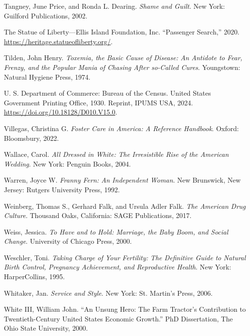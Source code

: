 \documentclass[
  american,
  letterpaper,
]{book}
\newlength{\cslhangindent}
\newenvironment{CSLReferences}[2] %
 {\begin{list}{}{%
  \setlength{\itemindent}{0pt}
  \setlength{\leftmargin}{0pt}
  \setlength{\parsep}{0pt}
  \ifodd #1
   \setlength{\leftmargin}{\cslhangindent}
   \setlength{\itemindent}{-1\cslhangindent}
  \fi
  \setlength{\itemsep}{#2\baselineskip}}}
 {\end{list}}
\begin{document}
\begin{CSLReferences}{1}{0}
Tangney, June Price, and Ronda L. Dearing. \emph{Shame and Guilt}. New
York: Guilford Publications, 2002.

The Statue of Liberty---Ellis Island Foundation, Inc. {``Passenger
Search,''} 2020. \url{https://heritage.statueofliberty.org/}.

Tilden, John Henry. \emph{Toxemia, the Basic Cause of Disease: An
Antidote to Fear, Frenzy, and the Popular Mania of Chasing After
so-Called Cures}. Youngstown: Natural Hygiene Press, 1974.

U. S. Department of Commerce: Bureau of the Census. United States
Government Printing Office, 1930. Reprint, IPUMS USA, 2024.
\url{https://doi.org/10.18128/D010.V15.0}.

Villegas, Christina G. \emph{Foster Care in America: A Reference
Handbook}. Oxford: Bloomsbury, 2022.

Wallace, Carol. \emph{All Dressed in White: The Irresistible Rise of the
American Wedding}. New York: Penguin Books, 2004.

Warren, Joyce W. \emph{Franny Fern: An Independent Woman}. New
Brunswick, New Jersey: Rutgers University Press, 1992.

Weinberg, Thomas S., Gerhard Falk, and Ursula Adler Falk. \emph{The
American Drug Culture}. Thousand Oaks, California: SAGE Publications,
2017.

Weiss, Jessica. \emph{To Have and to Hold: Marriage, the Baby Boom, and
Social Change}. University of Chicago Press, 2000.

Weschler, Toni. \emph{Taking Charge of Your Fertility: The Definitive
Guide to Natural Birth Control, Pregnancy Achievement, and Reproductive
Health}. New York: HarperCollins, 1995.

Whitaker, Jan. \emph{Service and Style}. New York: St. Martin's Press,
2006.

White III, William John. {``An Unsung Hero: The Farm Tractor's
Contribution to Twentieth-Century United States Economic Growth.''} PhD
Dissertation, The Ohio State University, 2000.


\end{CSLReferences}
\end{document}
